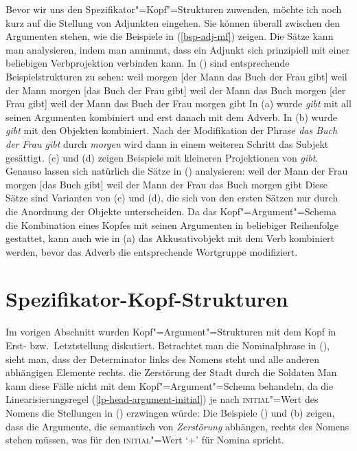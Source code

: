Bevor wir uns den Spezifikator"=Kopf"=Strukturen zuwenden, möchte ich noch kurz
auf die Stellung von Adjunkten eingehen. Sie können überall zwischen den Argumenten
stehen, wie die Beispiele in (\ref{bsp-adj-mf}) zeigen. Die Sätze kann man analysieren,
indem man annimmt, dass ein Adjunkt sich prinzipiell mit einer beliebigen Verbprojektion
verbinden kann. In () sind entsprechende Beispielstrukturen zu sehen:
\eal
\label{bsp-adj-mf-zwei}
\ex weil morgen [der Mann das Buch der Frau gibt]
\ex weil der Mann morgen [das Buch der Frau gibt]
\ex weil der Mann das Buch morgen [der Frau gibt]
\ex weil der Mann das Buch der Frau morgen gibt
\zl
In (a) wurde \emph{gibt} mit all seinen Argumenten kombiniert und erst danach
mit dem Adverb. In (b) wurde \emph{gibt} mit den Objekten kombiniert. Nach der
Modifikation der Phrase \emph{das Buch der Frau gibt} durch \emph{morgen} wird dann
in einem weiteren Schritt das Subjekt gesättigt. (c) und (d) zeigen Beispiele mit kleineren
Projektionen von \emph{gibt}. Genauso lassen sich natürlich die Sätze in ()
analysieren:
\eal
\ex weil der Mann der Frau morgen [das Buch gibt]
\ex weil der Mann der Frau das Buch morgen gibt
\zl
Diese Sätze sind Varianten von (c) und (d), die sich von den ersten Sätzen
nur durch die Anordnung der Objekte unterscheiden. Da das Kopf"=Argument"=Schema die Kombination
eines Kopfes mit seinen Argumenten in beliebiger Reihenfolge gestattet, kann auch wie in (a)
das Akkusativobjekt mit dem Verb kombiniert werden, bevor das Adverb die entsprechende Wortgruppe
modifiziert.%


\section{Spezifikator-Kopf-Strukturen}
\label{sec-spr}

Im vorigen Abschnitt wurden Kopf"=Argument"=Strukturen mit dem Kopf in Erst-
bzw.\ Letztstellung diskutiert. Betrachtet man die Nominalphrase in (),
sieht man, dass der Determinator links des Nomens steht und alle anderen abhängigen
Elemente rechts.
\ea
\label{ex-die-zerstoerung-der-stadt-dds}
die Zerstörung der Stadt durch die Soldaten
\z
Man kann diese Fälle nicht mit dem Kopf"=Argument"=Schema behandeln, da die Linearisierungsregel
(\ref{lp-head-argument-initial}) je nach \textsc{initial}"=Wert des Nomens die Stellungen in ()
erzwingen würde:
\eal
{}
\zl
Die Beispiele () und (b) zeigen, dass die Argumente, die semantisch von \emph{Zerstörung} abhängen, rechts des
Nomens stehen müssen, was für den \textsc{initial}"=Wert `+' für Nomina spricht.

